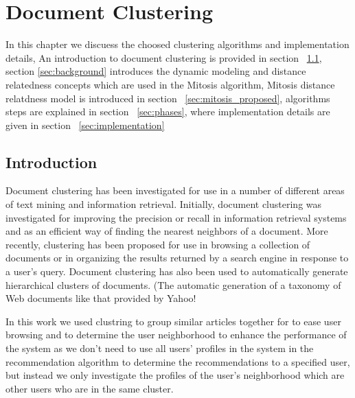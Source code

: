 
\chapter{Document Clustering} %

\label{clustering} %


In this chapter we discuess the choosed clustering algorithms and implementation details, An introduction to document clustering is provided in section ~\ref{sec:intro}, section \ref{sec:background} introduces the dynamic modeling and distance relatedness concepts which are used in the Mitosis algorithm, Mitosis distance relatdness model is introduced in section ~\ref{sec:mitosis_proposed}, algorithms steps are explained in section ~\ref{sec:phases}, where implementation details are given in section ~\ref{sec:implementation}

\section{Introduction} \label{sec:intro}
Document clustering has been investigated for use in a number of different areas of text
mining and information retrieval. Initially, document clustering was investigated for improving
the precision or recall in information retrieval systems and as an efficient way of
finding the nearest neighbors of a document. More recently, clustering has been
proposed for use in browsing a collection of documents or in organizing the results
returned by a search engine in response to a user's query. Document clustering has
also been used to automatically generate hierarchical clusters of documents. (The
automatic generation of a taxonomy of Web documents like that provided by Yahoo! \citep{clustering_15}

In this work we used clustring to group similar articles together for to ease user browsing and to determine the user neighborhood to enhance the performance of the system as we don't need to use all users' profiles in the system in the recommendation algorithm to determine the recommendations to a specified user, but instead we only investigate the profiles of the user's neighborhood which are other users who are in the same cluster.

